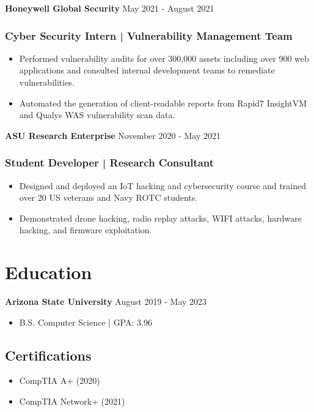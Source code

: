 \documentclass{article}
\newcommand{\resumesubsection}[2]{
  \noindent \textbf{#1} \hfill #2
}
\begin{document}
\resumesubsection{Honeywell Global Security}{May 2021 - August 2021}
\subsubsection{Cyber Security Intern | Vulnerability Management Team}
\begin{itemize}
  \item Performed vulnerability audits for over 300,000 assets including over 900 web applications and consulted internal development teams to remediate vulnerabilities.
  \item Automated the generation of client-readable reports from Rapid7 InsightVM and Qualys WAS vulnerability scan data.
\end{itemize}

\resumesubsection{ASU Research Enterprise}{November 2020 - May 2021}
\subsubsection{Student Developer | Research Consultant}
\begin{itemize}
  \item Designed and deployed an IoT hacking and cybersecurity course and trained over 20 US veterans and Navy ROTC students.
  \item Demonstrated drone hacking, radio replay attacks, WIFI attacks, hardware hacking, and firmware exploitation.
\end{itemize}

\section{Education}

\resumesubsection{Arizona State University}{August 2019 - May 2023}
\begin{itemize}
  \item B.S. Computer Science | GPA: 3.96
\end{itemize}

\subsection{Certifications}
\begin{itemize}
  \item CompTIA A+ (2020)
  \item CompTIA Network+ (2021)
\end{itemize}

\end{document}
